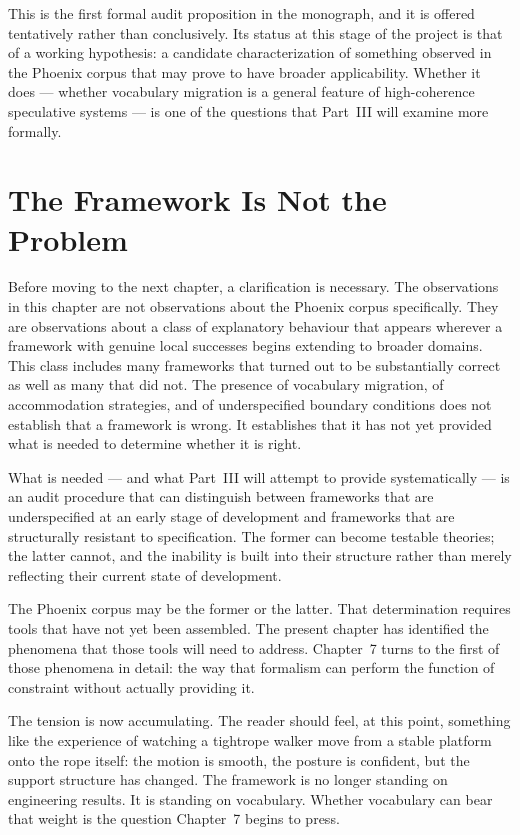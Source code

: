 This is the first formal audit proposition in the monograph,
and it is offered tentatively rather than conclusively.
Its status at this stage of the project is that of a
working hypothesis: a candidate characterization of
something observed in the Phoenix corpus that may prove
to have broader applicability. Whether it does --- whether
vocabulary migration is a general feature of high-coherence
speculative systems --- is one of the questions that
Part~III will examine more formally.

\section{The Framework Is Not the Problem}
\label{sec:framework-not-problem}

Before moving to the next chapter, a clarification is
necessary. The observations in this chapter are not
observations about the Phoenix corpus specifically. They
are observations about a class of explanatory behaviour
that appears wherever a framework with genuine local
successes begins extending to broader domains. This class
includes many frameworks that turned out to be substantially
correct as well as many that did not. The presence of
vocabulary migration, of accommodation strategies, and of
underspecified boundary conditions does not establish that
a framework is wrong. It establishes that it has not yet
provided what is needed to determine whether it is right.

What is needed --- and what Part~III will attempt to provide
systematically --- is an audit procedure that can distinguish
between frameworks that are underspecified at an early stage
of development and frameworks that are structurally resistant
to specification. The former can become testable theories;
the latter cannot, and the inability is built into their
structure rather than merely reflecting their current state
of development.

The Phoenix corpus may be the former or the latter. That
determination requires tools that have not yet been assembled.
The present chapter has identified the phenomena that those
tools will need to address. Chapter~7 turns to the first
of those phenomena in detail: the way that formalism can
perform the function of constraint without actually
providing it.

\medskip

The tension is now accumulating. The reader should feel,
at this point, something like the experience of watching
a tightrope walker move from a stable platform onto the
rope itself: the motion is smooth, the posture is confident,
but the support structure has changed. The framework is
no longer standing on engineering results. It is standing
on vocabulary. Whether vocabulary can bear that weight
is the question Chapter~7 begins to press.
